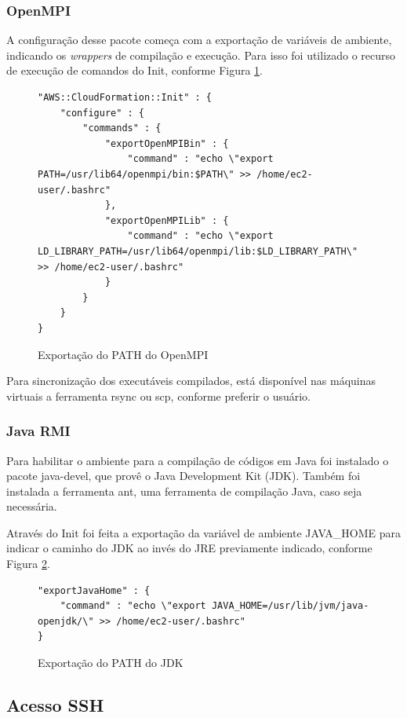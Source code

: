 \documentclass[tg]{mdtufsm}
\begin{document}
\subsubsection{OpenMPI}

A configuração desse pacote começa com a exportação de variáveis de ambiente, indicando os \emph{wrappers} de compilação e execução. Para isso foi utilizado o recurso de execução de comandos do Init, conforme Figura \ref{openMPI}.

\begin{figure}
\centering
\begin{lstlisting}[frame=single, numbers=none]
"AWS::CloudFormation::Init" : {
	"configure" : {
		"commands" : {
			"exportOpenMPIBin" : {
				"command" : "echo \"export PATH=/usr/lib64/openmpi/bin:$PATH\" >> /home/ec2-user/.bashrc"
			},
			"exportOpenMPILib" : {
				"command" : "echo \"export LD_LIBRARY_PATH=/usr/lib64/openmpi/lib:$LD_LIBRARY_PATH\" >> /home/ec2-user/.bashrc"
			}
		}
	}
}
\end{lstlisting}
\caption{Exportação do PATH do OpenMPI}
\label{openMPI}
\end{figure}

Para sincronização dos executáveis compilados, está disponível nas máquinas virtuais a ferramenta rsync ou scp, conforme preferir o usuário.

\subsubsection{Java RMI}

Para habilitar o ambiente para a compilação de códigos em Java foi instalado o pacote java-devel, que provê o Java Development Kit (JDK). Também foi instalada a ferramenta ant, uma ferramenta de compilação Java, caso seja necessária.

Através do Init foi feita a exportação da variável de ambiente JAVA\_HOME para indicar o caminho do JDK ao invés do JRE previamente indicado, conforme Figura \ref{javaHome}.

\begin{figure}
\centering
\begin{lstlisting}[frame=single, numbers=none]
"exportJavaHome" : {
	"command" : "echo \"export JAVA_HOME=/usr/lib/jvm/java-openjdk/\" >> /home/ec2-user/.bashrc"
}
\end{lstlisting}
\caption{Exportação do PATH do JDK}
\label{javaHome}
\end{figure}

\subsection{Acesso SSH}
\end{document}
